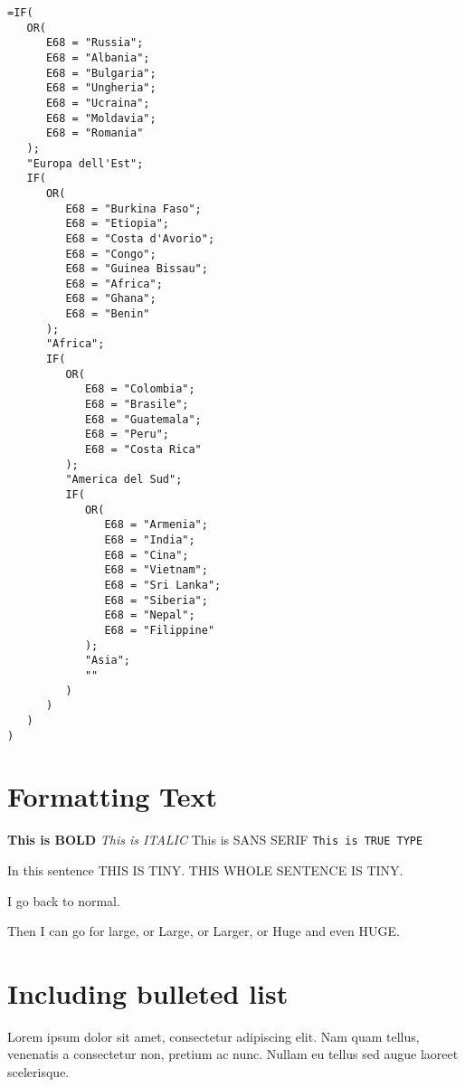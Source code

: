 %			

\begin{minipage}{\linewidth}
\begin{lstlisting}
=IF(
   OR(
      E68 = "Russia";
      E68 = "Albania";
      E68 = "Bulgaria";
      E68 = "Ungheria";
      E68 = "Ucraina";
      E68 = "Moldavia";
      E68 = "Romania"
   );
   "Europa dell'Est";
   IF(
      OR(
         E68 = "Burkina Faso";
         E68 = "Etiopia";
         E68 = "Costa d'Avorio";
         E68 = "Congo";
         E68 = "Guinea Bissau";
         E68 = "Africa";
         E68 = "Ghana";
         E68 = "Benin"
      );
      "Africa";
      IF(
         OR(
            E68 = "Colombia";
            E68 = "Brasile";
            E68 = "Guatemala";
            E68 = "Peru";
            E68 = "Costa Rica"
         );
         "America del Sud";
         IF(
            OR(
               E68 = "Armenia";
               E68 = "India";
               E68 = "Cina";
               E68 = "Vietnam";
               E68 = "Sri Lanka";
               E68 = "Siberia";
               E68 = "Nepal";
               E68 = "Filippine"
            );
            "Asia";
            ""
         )
      )
   )
)
\end{lstlisting}\label{code:nationality}
\end{minipage}

\section{Formatting Text}
\textbf{This is BOLD}
\textit{This is ITALIC}
\textsf{This is SANS SERIF}
\texttt{This is TRUE TYPE}

In this sentence {\tiny{THIS IS TINY}}.
\tiny THIS WHOLE SENTENCE IS TINY.

\normalsize I go back to normal.

Then I can go for {\large{large}}, or {\Large{Large}}, or {\LARGE{Larger}}, or {\huge{Huge}} and even {\Huge{HUGE}}.

\section{Including bulleted list}
Lorem ipsum dolor sit amet, consectetur adipiscing elit. Nam quam tellus, venenatis a consectetur non, pretium ac nunc. Nullam eu tellus sed augue laoreet scelerisque. 

